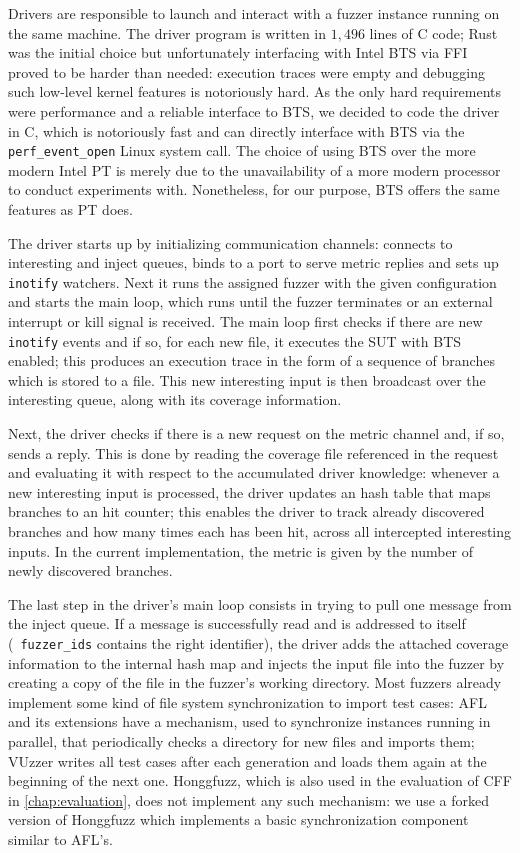 Drivers are responsible to launch and interact with a fuzzer instance running on
the same machine. The driver program is written in $1,496$ lines of C code; Rust
was the initial choice but unfortunately interfacing with Intel \ac{BTS} via
\ac{FFI} proved to be harder than needed: execution traces were empty and
debugging such low-level kernel features is notoriously hard. As the only hard
requirements were performance and a reliable interface to \ac{BTS}, we decided
to code the driver in C, which is notoriously fast and can directly interface
with \ac{BTS} via the \texttt{perf\_event\_open} Linux system call. The choice
of using \ac{BTS} over the more modern Intel \ac{PT} is merely due to the
unavailability of a more modern processor to conduct experiments with.
Nonetheless, for our purpose, \ac{BTS} offers the same features as \ac{PT} does.

The driver starts up by initializing communication channels: connects to
interesting and inject queues, binds to a port to serve metric replies and sets
up \texttt{inotify} watchers. Next it runs the assigned fuzzer with the given
configuration and starts the main loop, which runs until the fuzzer terminates
or an external interrupt or kill signal is received. The main loop first checks
if there are new \texttt{inotify} events and if so, for each new file, it
executes the \ac{SUT} with \ac{BTS} enabled; this produces an execution trace in
the form of a sequence of branches which is stored to a file. This new
interesting input is then broadcast over the interesting queue, along with its
coverage information.

Next, the driver checks if there is a new request on the metric channel and, if
so, sends a reply. This is done by reading the coverage file referenced in the
request and evaluating it with respect to the accumulated driver knowledge:
whenever a new interesting input is processed, the driver updates an hash table
that maps branches to an hit counter; this enables the driver to track already
discovered branches and how many times each has been hit, across all intercepted
interesting inputs. In the current implementation, the metric is given by the
number of newly discovered branches.

The last step in the driver's main loop consists in trying to pull one message
from the inject queue. If a message is successfully read and is addressed to
itself (\ie~\texttt{fuzzer\_ids} contains the right identifier), the driver adds
the attached coverage information to the internal hash map and injects the input
file into the fuzzer by creating a copy of the file in the fuzzer's working
directory. Most fuzzers already implement some kind of file system
synchronization to import test cases: AFL and its extensions have a mechanism,
used to synchronize instances running in parallel, that periodically checks a
directory for new files and imports them; VUzzer writes all test cases after
each generation and loads them again at the beginning of the next one.
Honggfuzz, which is also used in the evaluation of \ac{CFF} in
\autoref{chap:evaluation}, does not implement any such mechanism: we use a
forked version of Honggfuzz which implements a basic synchronization component
similar to AFL's.

